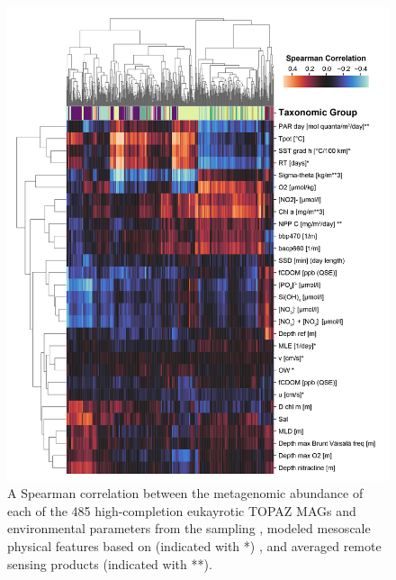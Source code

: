 \documentclass[12pt]{article}
\numberwithin{equation}{section}
\begin{document}
\begin{figure}
    \centering
    \includegraphics[width=0.9\columnwidth]{si-figures/modified-individual-mag-group-correlation-01.png}
    \caption{A Spearman correlation between the metagenomic abundance of each of the 485 high-completion eukayrotic TOPAZ MAGs and environmental parameters from the sampling \citep{taraoceansconsortium2016ecoa}, modeled mesoscale physical features based on \citet{d_Ovidio_2010} (indicated with *) , and averaged remote sensing products (indicated with **).}
    \label{fig:ind-corr}
\end{figure}
\end{document}

